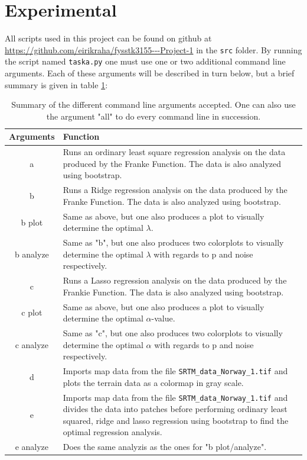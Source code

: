 \documentclass[12pt]{article}
\begin{document}
\section{Experimental}   \label{s:e}
All scripts used in this project can be found on github at \url{https://github.com/eirikraha/fysstk3155---Project-1} in the \texttt{src} folder. By running the script named \texttt{taska.py} one must use one or two additional command line arguments. Each of these arguments will be described in turn below, but a brief summary is given in table \ref{tabE:sum}:
\begin{table}[H]
\centering
\begin{tabular}{c|p{12cm}}
\textbf{Arguments} & \textbf{Function} \\ \hline
a & Runs an ordinary least square regression analysis on the data produced by the Franke Function. The data is also analyzed using bootstrap. \\ \hline
b & Runs a Ridge regression analysis on the data produced by the Franke Function. The data is also analyzed using bootstrap. \\ \hline
b plot & Same as above, but one also produces a plot to visually determine the optimal $\lambda$. \\ \hline
b analyze & Same as "b", but one also produces two colorplots to visually determine the optimal $\lambda$ with regards to p and noise respectively. \\ \hline
c & Runs a Lasso regression analysis on the data produced by the Frankie Function. The data is also analyzed using bootstrap. \\ \hline
c plot & Same as above, but one also produces a plot to visually determine the optimal $\alpha$-value. \\ \hline
c analyze & Same as "c", but one also produces two colorplots to visually determine the optimal $\alpha$ with regards to p and noise respectively. \\ \hline
d & Imports map data from the file \texttt{SRTM\_data\_Norway\_1.tif} and plots the terrain data as a colormap in gray scale. \\ \hline
e & Imports map data from the file \texttt{SRTM\_data\_Norway\_1.tif} and divides the data into patches before performing ordinary least squared, ridge and lasso regression using bootstrap to find the optimal regression analysis. \\ \hline
e analyze & Does the same analyzis as the ones for "b plot/analyze". 
\end{tabular}
\caption{Summary of the different command line arguments accepted. One can also use the argument "all" to do every command line in succession.}
\label{tabE:sum}
\end{table}
\end{document}
